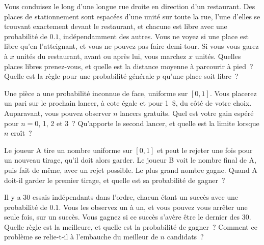 \begin{question}\label{iq:iv1:optimal-stopping:15}
Vous conduisez le long d'une longue rue droite en direction d'un restaurant. Des places de stationnement sont espacées d'une unité sur toute la rue, l'une d'elles se trouvant exactement devant le restaurant, et chacune est libre avec une probabilité de $0.1$, indépendamment des autres. Vous ne voyez si une place est libre qu'en l'atteignant, et vous ne pouvez pas faire demi-tour. Si vous vous garez à $x$ unités du restaurant, avant ou après lui, vous marchez $x$ unités. Quelles places libres prenez-vous, et quelle est la distance moyenne à parcourir à pied~? Quelle est la règle pour une probabilité générale $p$ qu'une place soit libre~?
\end{question}

\begin{question}\label{iq:iv1:optimal-stopping:16}
Une pièce a une probabilité inconnue de face, uniforme sur $[0, 1]$. Vous placerez un pari sur le prochain lancer, à cote égale et pour 1~\$, du côté de votre choix. Auparavant, vous pouvez observer $n$ lancers gratuits. Quel est votre gain espéré pour $n = 0$, 1, 2 et 3~? Qu'apporte le second lancer, et quelle est la limite lorsque $n$ croît~?
\end{question}

\begin{question}\label{iq:iv1:optimal-stopping:17}
Le joueur A tire un nombre uniforme sur $[0, 1]$ et peut le rejeter une fois pour un nouveau tirage, qu'il doit alors garder. Le joueur B voit le nombre final de A, puis fait de même, avec un rejet possible. Le plus grand nombre gagne. Quand A doit-il garder le premier tirage, et quelle est sa probabilité de gagner~?
\end{question}

\begin{question}\label{iq:iv1:optimal-stopping:18}
Il y a 30 essais indépendants dans l'ordre, chacun étant un succès avec une probabilité de $0.1$. Vous les observez un à un, et vous pouvez vous arrêter une seule fois, sur un succès. Vous gagnez si ce succès s'avère être le dernier des 30. Quelle règle est la meilleure, et quelle est la probabilité de gagner~? Comment ce problème se relie-t-il à l'embauche du meilleur de $n$ candidats~?
\end{question}

